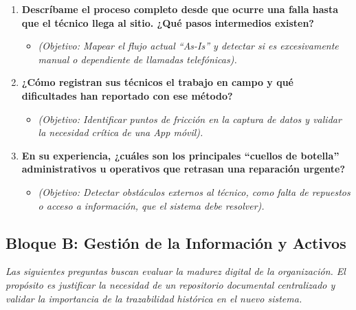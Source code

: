 \documentclass[12pt, a4paper]{article}
\begin{document}
\begin{enumerate}
    \item \textbf{Descríbame el proceso completo desde que ocurre una falla hasta que el técnico llega al sitio. ¿Qué pasos intermedios existen?}
    \begin{itemize}
        \item \textit{(Objetivo: Mapear el flujo actual ``As-Is'' y detectar si es excesivamente manual o dependiente de llamadas telefónicas).}
    \end{itemize}
    \item \textbf{¿Cómo registran sus técnicos el trabajo en campo y qué dificultades han reportado con ese método?}
    \begin{itemize}
        \item \textit{(Objetivo: Identificar puntos de fricción en la captura de datos y validar la necesidad crítica de una App móvil).}
    \end{itemize}
    \item \textbf{En su experiencia, ¿cuáles son los principales ``cuellos de botella'' administrativos u operativos que retrasan una reparación urgente?}
    \begin{itemize}
        \item \textit{(Objetivo: Detectar obstáculos externos al técnico, como falta de repuestos o acceso a información, que el sistema debe resolver).}
    \end{itemize}
\end{enumerate}

\subsection{Bloque B: Gestión de la Información y Activos}

\textit{Las siguientes preguntas buscan evaluar la madurez digital de la organización. El propósito es justificar la necesidad de un repositorio documental centralizado y validar la importancia de la trazabilidad histórica en el nuevo sistema.}
\end{document}
